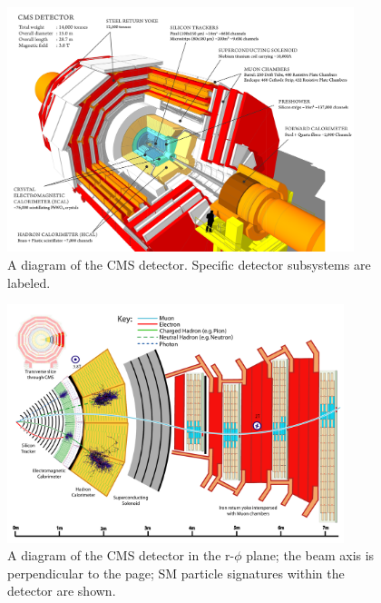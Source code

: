 \begin{figure}[hbp!]
\centering
\includegraphics[width=0.9\textwidth]{figs/howcmsworks.png}
\caption[A diagram of the CMS detector.]{A diagram of the CMS detector. Specific detector subsystems are labeled.}
\label{fig:howcmsworks}
\end{figure}

\begin{figure}[hbp!]
\centering
\includegraphics[width=0.875\textwidth]{figs/CMS-PRF-14-001_Figure_001.pdf}
\caption[A diagram of the CMS detector in the r-$\phi$ plane; particle signatures are shown.]{A diagram of the CMS detector in the r-$\phi$ plane; the beam axis is perpendicular to the page; SM particle signatures within the detector are shown.}
\label{fig:schematicview}
\end{figure}

